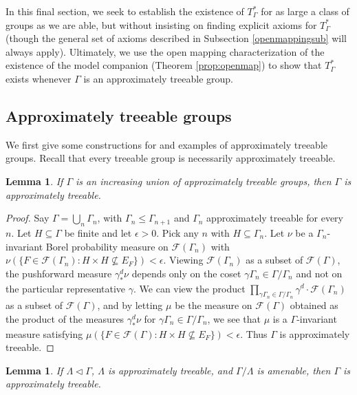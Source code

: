 \documentclass[12pt]{amsart}
\newtheorem{lem}[thm]{Lemma}
\theoremstyle{definition}
\def\cal{\mathcal}
\begin{document}
In this final section, we seek to establish the existence of $T_\Gamma^*$ for as large a class of groups as we are able, but without insisting on finding explicit axioms for $T_\Gamma^*$ (though the general set of axioms described in Subsection \ref{openmappingsub} will always apply). Ultimately, we use the open mapping characterization of the existence of the model companion (Theorem \ref{prop:openmap}) to show that $T_\Gamma^*$ exists whenever $\Gamma$ is an approximately treeable group.

\subsection{Approximately treeable groups}

We first give some constructions for and examples of approximately treeable groups. Recall that every treeable group is necessarily approximately treeable.

\begin{lem} \label{lem:union_approx_tree}
    If $\Gamma$ is an increasing union of approximately treeable groups, then $\Gamma$ is approximately treeable.
\end{lem}

\begin{proof}
   Say $\Gamma = \bigcup_n \Gamma_n$, with $\Gamma_n \leq \Gamma_{n+1}$ and $\Gamma_n$ approximately treeable for every $n$. Let $H \subseteq \Gamma$ be finite and let $\epsilon > 0$. Pick any $n$ with $H \subseteq \Gamma_n$. Let $\nu$ be a $\Gamma_n$-invariant Borel probability measure on $\cal F(\Gamma_n)$ with $\nu(\{F \in \cal F(\Gamma_n) : H \times H \not\subseteq E_F\}) < \epsilon$. Viewing $\cal F(\Gamma_n)$ as a subset of $\cal F(\Gamma)$, the pushforward measure $\gamma^d_* \nu$ depends only on the coset $\gamma \Gamma_n \in \Gamma / \Gamma_n$ and not on the particular representative $\gamma$. We can view the product $\prod_{\gamma \Gamma_n \in \Gamma / \Gamma_n} \gamma^d \cdot \cal F(\Gamma_n)$ as a subset of $\cal F(\Gamma)$, and by letting $\mu$ be the measure on $\cal F(\Gamma)$ obtained as the product of the measures $\gamma^d_* \nu$ for $\gamma \Gamma_n \in \Gamma / \Gamma_n$, we see that $\mu$ is a $\Gamma$-invariant measure satisfying $\mu(\{F \in \cal F(\Gamma) : H \times H \not\subseteq E_F\}) < \epsilon$. Thus $\Gamma$ is approximately treeable.
\end{proof}

\begin{lem} \label{lem:some_approx_tree}
	If $\Lambda \lhd \Gamma$, $\Lambda$ is approximately treeable, and $\Gamma / \Lambda$ is amenable, then $\Gamma$ is approximately treeable.  
\end{lem}
\end{document}
